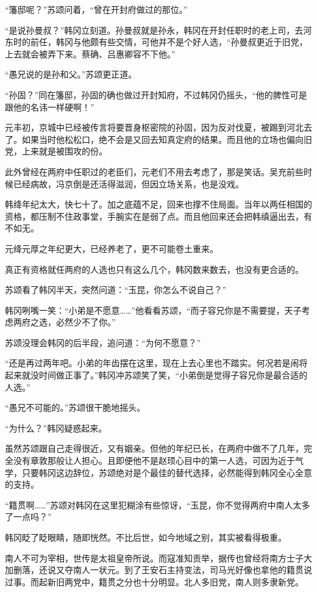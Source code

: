 “籓邸呢？”苏颂问着，“曾在开封府做过的那位。”

“是说孙曼叔？”韩冈立刻道。孙曼叔就是孙永，韩冈在开封任职时的老上司，去河东时的前任，韩冈与他颇有些交情，可他并不是个好人选，“孙曼叔更近于旧党，上去就会被弄下来。蔡确、吕惠卿容不下他。”

“愚兄说的是孙和父。”苏颂更正道。

“孙固？”同在籓邸，孙固的确也做过开封知府，不过韩冈仍摇头，“他的脾性可是跟他的名讳一样硬啊！”

元丰初，京城中已经被传言将要晋身枢密院的孙固，因为反对伐夏，被踢到河北去了。如果当时他松松口，绝不会是又回去知真定府的结果。而且他的立场也偏向旧党，上来就是被围攻的份。

此外曾经在两府中任职过的老臣们，元老们不用去考虑了，那是笑话。吴充前些时候已经病故，冯京倒是还活得滋润，但因立场关系，也是没戏。

韩绛年纪太大，快七十了。加之底蕴不足，回来也撑不住局面。当年以两任相国的资格，都压制不住政事堂，手腕实在是弱了点。而且他回来还会把韩缜逼出去，有不如无。

元绛元厚之年纪更大，已经养老了，更不可能卷土重来。

真正有资格就任两府的人选也只有这么几个，韩冈数来数去，也没有更合适的。

苏颂看了韩冈半天，突然问道：“玉昆，你怎么不说自己？”

韩冈咧嘴一笑：“小弟是不愿意……”他看看苏颂，“而子容兄你是不需要提，天子考虑两府之选，必然少不了你。”

苏颂没理会韩冈的后半段，追问道：“为何不愿意？”

“还是再过两年吧。小弟的年齿摆在这里，现在上去心里也不踏实。何况若是闹将起来就没时间做正事了。”韩冈冲苏颂笑了笑，“小弟倒是觉得子容兄你是最合适的人选。”

“愚兄不可能的。”苏颂很干脆地摇头。

“为什么？”韩冈疑惑起来。

虽然苏颂跟自己走得很近，又有姻亲。但他的年纪已长，在两府中做不了几年，完全没有章敦那般让人担心。且即便他不是赵顼心目中的第一人选，可因为近于气学，只要韩冈这边辞位，苏颂绝对是个最佳的替代选择，必然能得到韩冈全心全意的支持。

“籍贯啊……”苏颂对韩冈在这里犯糊涂有些惊讶，“玉昆，你不觉得两府中南人太多了一点吗？”

韩冈眨了眨眼睛，随即恍然。不比后世，如今地域之别，其实被看得极重。


南人不可为宰相，世传是太祖皇帝所说。而寇准知贡举，据传也曾经将南方士子大加删落，还说又夺南人一状元。到了王安石主持变法，司马光好像也拿他的籍贯说过事。而起新旧两党中，籍贯之分也十分明显。北人多旧党，南人则多隶新党。

